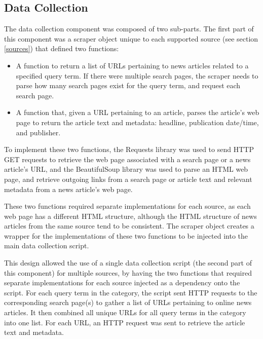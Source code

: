 \documentclass{report}
\begin{document}
\subsection{Data Collection} \label{des-data-collection}

The data collection component was composed of two sub-parts.
The first part of this component was a scraper object unique to each supported source (see section \ref{sources}) that defined two functions:
\begin{itemize}
	\item A function to return a list of URLs pertaining to news articles related to a specified query term.
		If there were multiple search pages, the scraper needs to parse how many search pages exist for the query term, and request each search page.
	\item A function that, given a URL pertaining to an article, parses the article's web page to return the article text and metadata: headline, publication date/time, and publisher.
\end{itemize}

To implement these two functions, the Requests library \cite{Requests} was used to send HTTP GET requests to retrieve the web page associated with a search page or a news article's URL, and the BeautifulSoup library \cite{BeautifulSoup} was used to parse an HTML web page, and retrieve outgoing links from a search page or article text and relevant metadata from a news article's web page.

These two functions required separate implementations for each source, as each web page has a different HTML structure, although the HTML structure of news articles from the same source tend to be consistent.
The scraper object creates a wrapper for the implementations of these two functions to be injected into the main data collection script.

This design allowed the use of a single data collection script (the second part of this component) for multiple sources, by having the two functions that required separate implementations for each source injected as a dependency onto the script.
For each query term in the category, the script sent HTTP requests to the corresponding search page(s) to gather a list of URLs pertaining to online news articles.
It then combined all unique URLs for all query terms in the category into one list.
For each URL, an HTTP request was sent to retrieve the article text and metadata.
\end{document}
